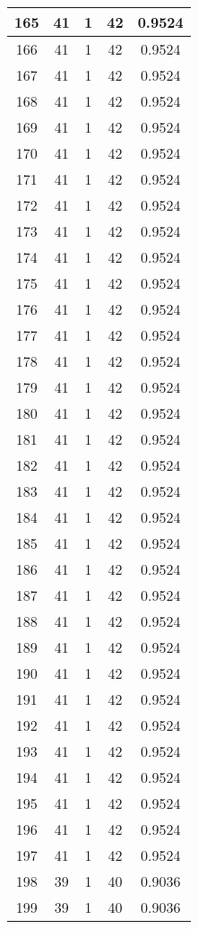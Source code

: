 \documentclass[letterpaper, 12pt]{article}
\begin{document}
\begin{longtable}{|c|c|c|c|c|}
\hline
165 & 41 & 1 & 42 & 0.9524 \\
\hline
166 & 41 & 1 & 42 & 0.9524 \\
\hline
167 & 41 & 1 & 42 & 0.9524 \\
\hline
168 & 41 & 1 & 42 & 0.9524 \\
\hline
169 & 41 & 1 & 42 & 0.9524 \\
\hline
170 & 41 & 1 & 42 & 0.9524 \\
\hline
171 & 41 & 1 & 42 & 0.9524 \\
\hline
172 & 41 & 1 & 42 & 0.9524 \\
\hline
173 & 41 & 1 & 42 & 0.9524 \\
\hline
174 & 41 & 1 & 42 & 0.9524 \\
\hline
175 & 41 & 1 & 42 & 0.9524 \\
\hline
176 & 41 & 1 & 42 & 0.9524 \\
\hline
177 & 41 & 1 & 42 & 0.9524 \\
\hline
178 & 41 & 1 & 42 & 0.9524 \\
\hline
179 & 41 & 1 & 42 & 0.9524 \\
\hline
180 & 41 & 1 & 42 & 0.9524 \\
\hline
181 & 41 & 1 & 42 & 0.9524 \\
\hline
182 & 41 & 1 & 42 & 0.9524 \\
\hline
183 & 41 & 1 & 42 & 0.9524 \\
\hline
184 & 41 & 1 & 42 & 0.9524 \\
\hline
185 & 41 & 1 & 42 & 0.9524 \\
\hline
186 & 41 & 1 & 42 & 0.9524 \\
\hline
187 & 41 & 1 & 42 & 0.9524 \\
\hline
188 & 41 & 1 & 42 & 0.9524 \\
\hline
189 & 41 & 1 & 42 & 0.9524 \\
\hline
190 & 41 & 1 & 42 & 0.9524 \\
\hline
191 & 41 & 1 & 42 & 0.9524 \\
\hline
192 & 41 & 1 & 42 & 0.9524 \\
\hline
193 & 41 & 1 & 42 & 0.9524 \\
\hline
194 & 41 & 1 & 42 & 0.9524 \\
\hline
195 & 41 & 1 & 42 & 0.9524 \\
\hline
196 & 41 & 1 & 42 & 0.9524 \\
\hline
197 & 41 & 1 & 42 & 0.9524 \\
\hline
198 & 39 & 1 & 40 & 0.9036 \\
\hline
199 & 39 & 1 & 40 & 0.9036 \\
\hline
\end{longtable}
\end{document}
